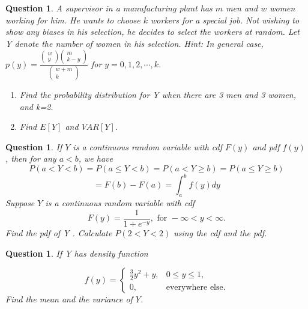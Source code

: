 \documentclass[12pt]{article}
\newtheorem{ques}[theorem]{Question}
\begin{document}
\newpage
\begin{ques}
A supervisor in a manufacturing plant has $m$ men and $w$ women working
for him. He wants to choose $k$ workers for a special job. Not wishing to show
any biases in his selection, he decides to select the  workers at random. Let
Y denote the number of women in his selection. 
\textit{Hint: } In general case, $p(y)=\frac{\begin{pmatrix} w\\ y \end{pmatrix}\begin{pmatrix}m \\k-y \end{pmatrix}}{\begin{pmatrix} w+m\\ k\end{pmatrix}}$ for $y=0,1,2,\cdots, k$.
\begin{enumerate}
    \item Find the probability
distribution for Y when there are 3 men and 3 women, and k=2.
\item Find $E[Y]$ and $VAR[Y]$.
\end{enumerate}
\end{ques}


\newpage 
\begin{ques}
If $Y$ is a continuous random variable with cdf $F(y)$ and pdf $f(y)$, then for any $a < b$, we have
\[P(a<Y<b)=P(a\leq Y< b) =P(a< Y\geq  b)=P(a\leq Y\geq b)
\]
\[=F(b)-F(a)=\int_a^b f(y)dy
\]
Suppose $Y$ is a continuous random variable with cdf
\[F(y)=\frac{1}{1+e^{-y}}, \text{ for }-\infty <y <\infty.
\]
Find the pdf of Y . Calculate $P(2 < Y < 2)$ using the cdf and the pdf.
\end{ques}


\newpage
\begin{ques}
If Y has density function

\[f(y)=\begin{cases}\frac{3}{2}y^2+y, & 0\leq y \leq 1,\\
0, & \text{everywhere else.}
\end{cases}
\]
Find the mean and the variance of $Y$.
\end{ques}
\end{document}
